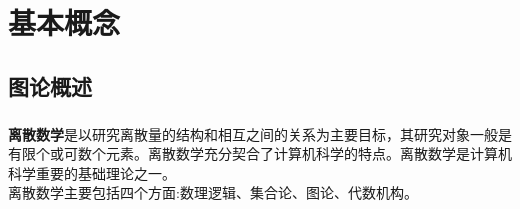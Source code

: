 \documentclass[11pt,a4paper,openany]{book}
\begin{document}
\pagestyle{plain}  %
\chapter{基本概念}
\section{图论概述}
\paragraph{}\textbf{离散数学}是以研究离散量的结构和相互之间的关系为主要目标，其研究对象一般是有限个或可数个元素。离散数学充分契合了计算机科学的特点。离散数学是计算机科学重要的基础理论之一。\\
离散数学主要包括四个方面:数理逻辑、集合论、图论、代数机构。\\
\end{document}
